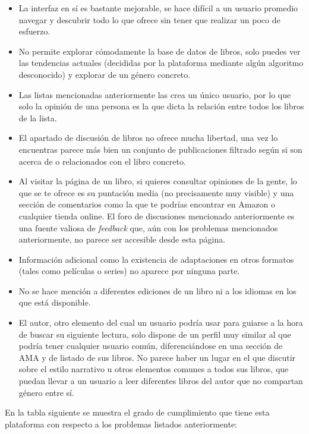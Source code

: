 \begin{itemize}
    \item La interfaz en sí es bastante mejorable, se hace difícil a un usuario promedio navegar y descubrir todo lo que ofrece sin tener que realizar un poco de esfuerzo.
    \item No permite explorar cómodamente la base de datos de libros, solo puedes ver las tendencias actuales (decididas por la plataforma mediante algún algoritmo desconocido) y explorar de un género concreto.
    \item Las listas mencionadas anteriormente las crea un único usuario, por lo que solo la opinión de una persona es la que dicta la relación entre todos los libros de la lista.
    \item El apartado de discusión de libros no ofrece mucha libertad, una vez lo encuentras parece más bien un conjunto de publicaciones filtrado según si son acerca de o relacionados con el libro concreto.
    \item Al visitar la página de un libro, si quieres consultar opiniones de la gente, lo que se te ofrece es su puntación media (no precisamente muy visible) y una sección de comentarios como la que te podrías encontrar en Amazon o cualquier tienda online. El foro de discusiones mencionado anteriormente es una fuente valiosa de \textit{feedback} que, aún con los problemas mencionados anteriormente, no parece ser accesible desde esta página.
    \item Información adicional como la existencia de adaptaciones en otros formatos (tales como películas o series) no aparece por ninguna parte.
    \item No se hace mención a diferentes ediciones de un libro ni a los idiomas en los que está disponible.
    \item El autor, otro elemento del cual un usuario podría usar para guiarse a la hora de buscar su siguiente lectura, solo dispone de un perfil muy similar al que podría tener cualquier usuario común, diferenciándose en una sección de AMA y de listado de sus libros. No parece haber un lugar en el que discutir sobre el estilo narrativo u otros elementos comunes a todos sus libros, que puedan llevar a un usuario a leer diferentes libros del autor que no compartan género entre sí.
\end{itemize}

En la tabla siguiente se muestra el grado de cumplimiento que tiene esta plataforma con respecto a los problemas listados anteriormente:

